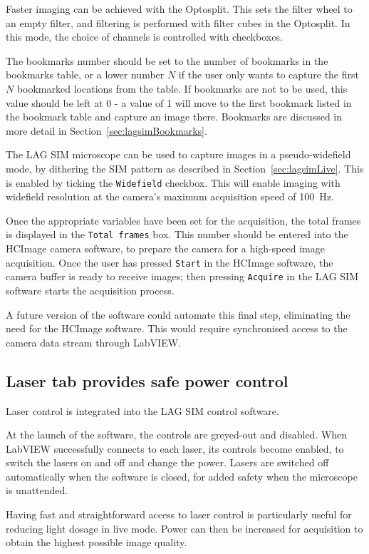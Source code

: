 Faster imaging can be achieved with the Optosplit.
This sets the filter wheel to an empty filter, and filtering is performed with filter cubes in the Optosplit.
In this mode, the choice of channels is controlled with checkboxes.

The bookmarks number should be set to the number of bookmarks in the bookmarks table, or a lower number $N$ if the user only wants to capture the first $N$ bookmarked locations from the table.
If bookmarks are not to be used, this value should be left at 0 - a value of 1 will move to the first bookmark listed in the bookmark table and capture an image there.
Bookmarks are discussed in more detail in Section~\ref{sec:lagsimBookmarks}.

The LAG SIM microscope can be used to capture images in a pseudo-widefield mode, by dithering the SIM pattern as described in Section~\ref{sec:lagsimLive}.
This is enabled by ticking the \texttt{Widefield} checkbox.
This will enable imaging with widefield resolution at the camera's maximum acquisition speed of \SI{100}{\hertz}.

Once the appropriate variables have been set for the acquisition, the total frames is displayed in the \texttt{Total frames} box.
This number should be entered into the HCImage camera software, to prepare the camera for a high-speed image acquisition.
Once the user has pressed \texttt{Start} in the HCImage software, the camera buffer is ready to receive images; then pressing \texttt{Acquire} in the LAG SIM software starts the acquisition process.

A future version of the software could automate this final step, eliminating the need for the HCImage software.
This would require synchronised access to the camera data stream through LabVIEW.


\subsection{Laser tab provides safe power control}
Laser control is integrated into the LAG SIM control software.

At the launch of the software, the controls are greyed-out and disabled.
When LabVIEW successfully connects to each laser, its controls become enabled, to switch the lasers on and off and change the power.
Lasers are switched off automatically when the software is closed, for added safety when the microscope is unattended.

Having fast and straightforward access to laser control is particularly useful for reducing light dosage in live mode.
Power can then be increased for acquisition to obtain the highest possible image quality.

